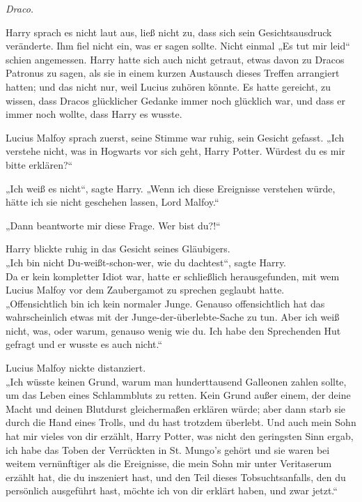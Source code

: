 {\emph{Draco.}

Harry sprach es nicht laut aus, ließ nicht zu, dass sich sein Gesichtsausdruck veränderte. Ihm fiel nicht ein, was er sagen sollte. Nicht einmal „Es tut mir leid“ schien angemessen. Harry hatte sich auch nicht getraut, etwas davon zu Dracos Patronus zu sagen, als sie in einem kurzen Austausch dieses Treffen arrangiert hatten; und das nicht nur, weil Lucius zuhören könnte. Es hatte gereicht, zu wissen, dass Dracos glücklicher Gedanke immer noch glücklich war, und dass er immer noch wollte, dass Harry es wusste.

Lucius Malfoy sprach zuerst, seine Stimme war ruhig, sein Gesicht gefasst. „Ich verstehe nicht, was in Hogwarts vor sich geht, Harry Potter. Würdest du es mir bitte erklären?“

„Ich weiß es nicht“, sagte Harry. „Wenn ich diese Ereignisse verstehen würde, hätte ich sie nicht geschehen lassen, Lord Malfoy.“

„Dann beantworte mir diese Frage. Wer bist du?!“

Harry blickte ruhig in das Gesicht seines Gläubigers.\\ „Ich bin nicht Du-weißt-schon-wer, wie du dachtest“, sagte Harry.\\ Da er kein kompletter Idiot war, hatte er schließlich herausgefunden, mit wem Lucius Malfoy vor dem Zaubergamot zu sprechen geglaubt hatte.\\ „Offensichtlich bin ich kein normaler Junge. Genauso offensichtlich hat das wahrscheinlich etwas mit der Junge-der-überlebte-Sache zu tun. Aber ich weiß nicht, was, oder warum, genauso wenig wie du. Ich habe den Sprechenden Hut gefragt und er wusste es auch nicht.“

Lucius Malfoy nickte distanziert.\\ „Ich wüsste keinen Grund, warum man hunderttausend Galleonen zahlen sollte, um das Leben eines Schlammbluts zu retten. Kein Grund außer einem, der deine Macht und deinen Blutdurst gleichermaßen erklären würde; aber dann starb sie durch die Hand eines Trolls, und du hast trotzdem überlebt. Und auch mein Sohn hat mir vieles von dir erzählt, Harry Potter, was nicht den geringsten Sinn ergab, ich habe das Toben der Verrückten in St. Mungo's gehört und sie waren bei weitem vernünftiger als die Ereignisse, die mein Sohn mir unter Veritaserum erzählt hat, die du inszeniert hast, und den Teil dieses Tobsuchtsanfalls, den du persönlich ausgeführt hast, möchte ich von dir erklärt haben, und zwar jetzt.“

}
